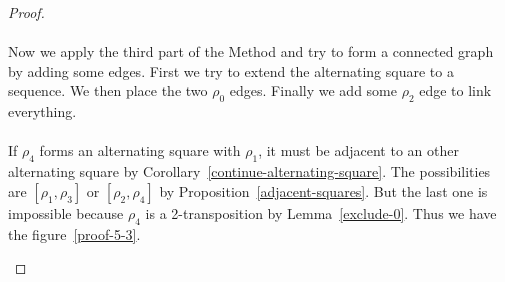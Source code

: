 \begin{proof}
\begin{figure}[H]
\begin{center}
\begin{tikzpicture}[scale=.8]
    \end{tikzpicture}
    \caption{}
    \label{proof-5-2}
  \end{center}
\end{figure}

\paragraph{}
Now we apply the third part of the Method and try to form a connected graph by adding some edges. First we try to extend the alternating square to a sequence. We then place the two $\rho_0$ edges. Finally we add some $\rho_2$ edge to link everything.

\paragraph{}
If $\rho_4$ forms an alternating square with $\rho_1$, it must be adjacent to an other alternating square by Corollary~\ref{continue-alternating-square}. The possibilities are $[\rho_1, \rho_3]$ or $[\rho_2, \rho_4]$ by Proposition~\ref{adjacent-squares}. But the last one is impossible because $\rho_4$ is a 2-transposition by Lemma~\ref{exclude-0}. Thus we have the figure~\ref{proof-5-3}.

\begin{figure}[H]
  \begin{center}
\end{center}
\end{figure}
\end{proof}
